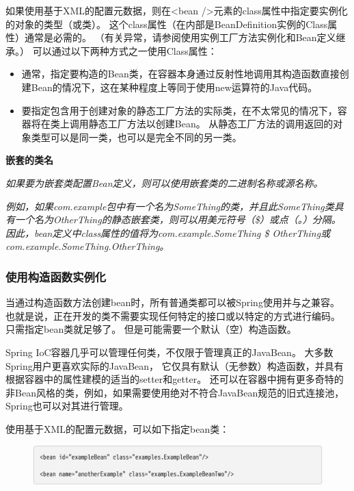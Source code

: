 如果使用基于XML的配置元数据，则在<bean />元素的class属性中指定要实例化的对象的类型（或类）。 
这个class属性（在内部是BeanDefinition实例的Class属性）通常是必需的。 
（有关异常，请参阅使用实例工厂方法实例化和Bean定义继承。）
可以通过以下两种方式之一使用Class属性：

\begin{itemize}
    \item 通常，指定要构造的Bean类，在容器本身通过反射性地调用其构造函数直接创建Bean的情况下，这在某种程度上等同于使用new运算符的Java代码。
    \item 要指定包含用于创建对象的静态工厂方法的实际类，在不太常见的情况下，容器将在类上调用静态工厂方法以创建Bean。 从静态工厂方法的调用返回的对象类型可以是同一类，也可以是完全不同的另一类。
\end{itemize}

\begin{center}
    \textbf{嵌套的类名}
\end{center}

\textit{如果要为嵌套类配置Bean定义，则可以使用嵌套类的二进制名称或源名称。}

\textit{例如，如果com.example包中有一个名为SomeThing的类，并且此SomeThing类具有一个名为OtherThing的静态嵌套类，则可以用美元符号（\$）或点（。）分隔。 因此，bean定义中class属性的值将为com.example.SomeThing \$ OtherThing或com.example.SomeThing.OtherThing。}

\subsubsection{使用构造函数实例化}
当通过构造函数方法创建bean时，所有普通类都可以被Spring使用并与之兼容。 
也就是说，正在开发的类不需要实现任何特定的接口或以特定的方式进行编码。 
只需指定bean类就足够了。 但是可能需要一个默认（空）构造函数。

Spring IoC容器几乎可以管理任何类，不仅限于管理真正的JavaBean。 
大多数Spring用户更喜欢实际的JavaBean，
它仅具有默认（无参数）构造函数，并具有根据容器中的属性建模的适当的setter和getter。 
还可以在容器中拥有更多奇特的非Bean风格的类，例如，如果需要使用绝对不符合JavaBean规范的旧式连接池，
Spring也可以对其进行管理。

使用基于XML的配置元数据，可以如下指定bean类：

\begin{figure}[ht]
    \centering
    \includegraphics[width=1\linewidth]{./Figure/IMG_code_14.png}
\end{figure}

